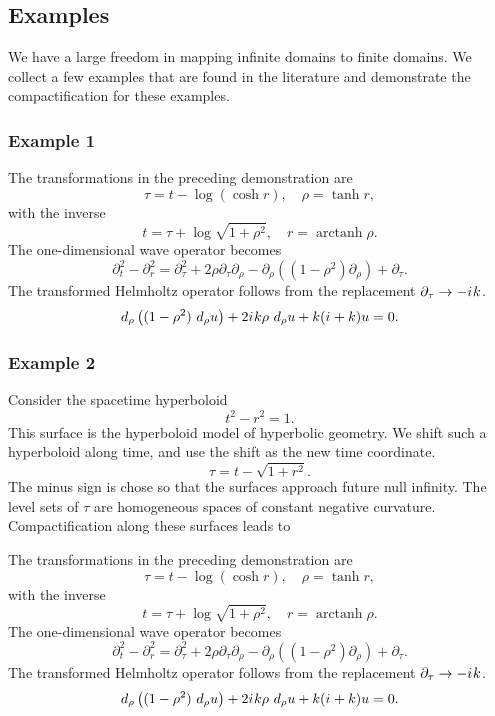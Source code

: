 \documentclass[final,onefignum,onetabnum]{siamart190516}
\newcommand{\iu}{{i\mkern1mu}}
\DeclareMathOperator\arctanh{arctanh}
\begin{document}
\subsection{Examples}
We have a large freedom in mapping infinite domains to finite domains. We collect a few examples that are found in the literature and demonstrate the compactification for these examples.

\subsubsection{Example 1}
The transformations in the preceding demonstration are \cite{bizon2017global, bizon2020toy, donninger2020strichartz}
\[ \tau = t - \log(\cosh r), \quad \rho = \tanh r,\]
with the inverse
\[ t = \tau + \log\sqrt{1+\rho^2}, \quad r = \arctanh \rho. \]
The one-dimensional wave operator becomes
\[ \partial_t^2 - \partial_r^2 = \partial_\tau^2 + 2\rho\partial_\tau \partial_\rho - \partial_\rho \left( (1-\rho^2) \partial_\rho\right) + \partial_\tau. \]
The transformed Helmholtz operator follows from the replacement $\partial_\tau\to -\iu k$. 
\[ d_\rho\left((1-\rho^2) \ d_\rho u \right) + 2\iu k \rho\ d_\rho u + k (\iu+k) u = 0. \]

\subsubsection{Example 2}
Consider the spacetime hyperboloid
\[ t^2 - r^2 = 1. \]
This surface is the hyperboloid model of hyperbolic geometry. We shift such a hyperboloid along time, and use the shift as the new time coordinate.
\[ \tau = t - \sqrt{1+r^2}.\] 
The minus sign is chose so that the surfaces approach future null infinity. The level sets of $\tau$ are homogeneous spaces of constant negative curvature. Compactification along these surfaces leads to 

The transformations in the preceding demonstration are  \cite{bizon2017global, bizon2020toy, donninger2020strichartz}
\[ \tau = t - \log(\cosh r), \quad \rho = \tanh r,\]
with the inverse
\[ t = \tau + \log\sqrt{1+\rho^2}, \quad r = \arctanh \rho. \]
The one-dimensional wave operator becomes
\[ \partial_t^2 - \partial_r^2 = \partial_\tau^2 + 2\rho\partial_\tau \partial_\rho - \partial_\rho \left( (1-\rho^2) \partial_\rho\right) + \partial_\tau. \]
The transformed Helmholtz operator follows from the replacement $\partial_\tau\to -\iu k$. 
\[ d_\rho\left((1-\rho^2) \ d_\rho u \right) + 2\iu k \rho\ d_\rho u + k (\iu+k) u = 0. \]
\end{document}
